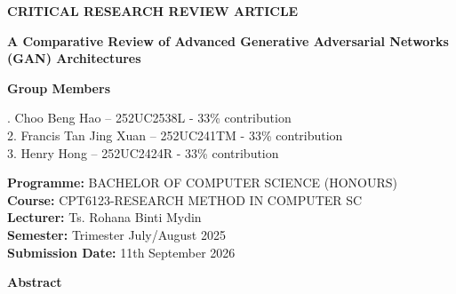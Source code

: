 \documentclass[12pt,a4paper]{article}
\begin{document}
\begin{center}

{\fontsize{18}{22}\selectfont\textbf{CRITICAL RESEARCH REVIEW ARTICLE}}

\vspace{0.5cm}

{\fontsize{18}{22}\selectfont\textbf{A Comparative Review of Advanced Generative Adversarial Networks (GAN) Architectures}}

\vspace{1cm}

{\fontsize{12}{14}\selectfont\textbf{Group Members}}

\vspace{0.3cm}

{\fontsize{12}{14}. Choo Beng Hao -- 252UC2538L - 33\% contribution \\
2. Francis Tan Jing Xuan -- 252UC241TM - 33\% contribution\\
3. Henry Hong -- 252UC2424R - 33\% contribution\\

}

\vspace{0.8cm}

{\fontsize{12}{14}\selectfont
\textbf{Programme:} BACHELOR OF COMPUTER SCIENCE (HONOURS) \\
\textbf{Course:} CPT6123-RESEARCH METHOD IN COMPUTER SC\\
\textbf{Lecturer:} Ts. Rohana Binti Mydin\\
\textbf{Semester:} Trimester July/August 2025\\
\textbf{Submission Date:} 11th September 2026
}

\end{center}



\vspace{0.5cm}

\noindent
\textbf{Abstract}

\vspace{0.2cm}
\end{document}
